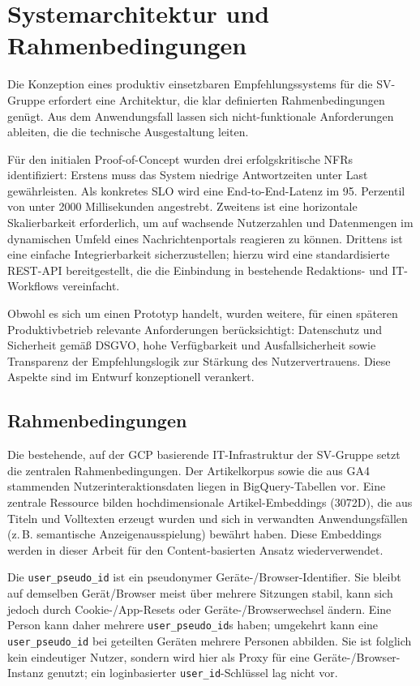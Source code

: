 \section{Systemarchitektur und Rahmenbedingungen}
Die Konzeption eines produktiv einsetzbaren Empfehlungssystems für die SV-Gruppe erfordert eine Architektur, 
die klar definierten Rahmenbedingungen genügt. Aus dem Anwendungsfall lassen sich nicht-funktionale Anforderungen ableiten,
 die die technische Ausgestaltung leiten.
\label{sec:nfr}

Für den initialen Proof-of-Concept wurden drei erfolgskritische \ac{NFR}s identifiziert:
Erstens muss das System niedrige Antwortzeiten unter Last gewährleisten. Als konkretes \ac{SLO} wird eine 
End-to-End-Latenz im 95. Perzentil von unter 2000 Millisekunden angestrebt.
Zweitens ist eine horizontale Skalierbarkeit erforderlich, um auf wachsende Nutzerzahlen und Datenmengen 
im dynamischen Umfeld eines Nachrichtenportals reagieren zu können.
Drittens ist eine einfache Integrierbarkeit sicherzustellen; hierzu wird eine standardisierte REST-API bereitgestellt, 
die die Einbindung in bestehende Redaktions- und IT-Workflows vereinfacht.


Obwohl es sich um einen Prototyp handelt, wurden weitere, für einen späteren Produktivbetrieb relevante Anforderungen 
berücksichtigt: Datenschutz und Sicherheit gemäß \ac{DSGVO}, hohe Verfügbarkeit und Ausfallsicherheit sowie 
Transparenz der Empfehlungslogik zur Stärkung des Nutzervertrauens. Diese Aspekte sind im Entwurf konzeptionell verankert.

\subsection{Rahmenbedingungen}
Die bestehende, auf der \ac{GCP} basierende IT-Infrastruktur der SV-Gruppe setzt die zentralen Rahmenbedingungen. 
Der Artikelkorpus sowie die aus \ac{GA4} stammenden Nutzerinteraktionsdaten liegen in BigQuery-Tabellen vor. 
Eine zentrale Ressource bilden hochdimensionale Artikel-Embeddings (3072D), die aus Titeln und Volltexten erzeugt 
wurden und sich in verwandten Anwendungsfällen (z.\,B. semantische Anzeigenausspielung) bewährt haben. 
Diese Embeddings werden in dieser Arbeit für den Content-basierten Ansatz wiederverwendet.

Die \texttt{user\_pseudo\_id} ist ein pseudonymer Geräte-/Browser-Identifier. Sie bleibt auf demselben Gerät/Browser 
meist über mehrere Sitzungen stabil, kann sich jedoch durch Cookie-/App-Resets oder Geräte-/Browserwechsel ändern. 
Eine Person kann daher mehrere \texttt{user\_pseudo\_id}s haben; umgekehrt kann eine \texttt{user\_pseudo\_id} bei 
geteilten Geräten mehrere Personen abbilden. Sie ist folglich kein eindeutiger Nutzer, sondern wird hier als Proxy 
für eine Geräte-/Browser-Instanz genutzt; ein loginbasierter \texttt{user\_id}-Schlüssel lag nicht vor.

